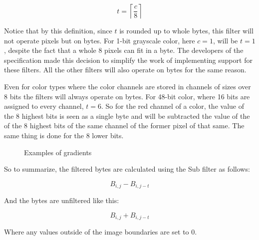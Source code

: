 \begin{equation*}
  t = \left\lceil \frac{c}{8} \right\rceil
\end{equation*}

Notice that by this definition, since $t$ is rounded up to whole
bytes, this filter will not operate pixels but on bytes. For 1-bit
grayscale color, here $c=1$, will be $t=1$, despite the fact that a
whole $8$ pixels can fit in a byte. The developers of the \png
specification made this decision to simplify the work of implementing
support for these filters. All the other filters will also operate on
bytes for the same reason.

Even for color types where the color channels are stored in channels
of sizes over $8$ bits the filters will always operate on bytes. For
48-bit \rgb color, where 16 bits are assigned to every channel,
$t=6$. So for the red channel of a color, the value of the 8 highest
bits is seen as a single byte and will be subtracted the value of the
of the 8 highest bits of the same channel of the former pixel of that
same. The same thing is done for the 8 lower bits.

\begin{figure}[h!]
  \centering


  \caption{Examples of gradients}
\end{figure}

So to summarize, the filtered bytes are calculated using the Sub
filter as follows:

\begin{equation*}
  B_{i,j} - B_{i,j-t}
\end{equation*}

And the bytes are unfiltered like this:

\begin{equation*}
  B_{i,j} + B_{i,j-t}
\end{equation*}

Where any values outside of the image boundaries are set to $0$.

